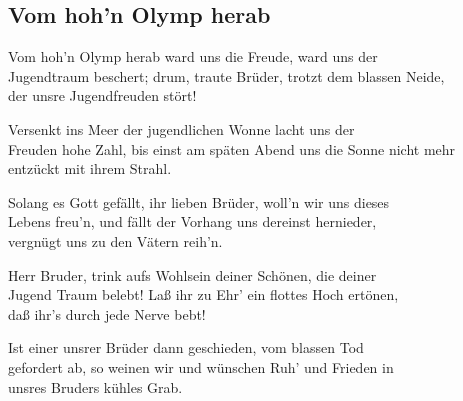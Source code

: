 
\subsection*{Vom hoh'n Olymp herab}
%


\thestrophe Vom hoh'n Olymp herab ward uns die Freude, ward uns der \\
Jugendtraum beschert; drum, traute Brüder, trotzt dem blassen Neide, \\
der unsre Jugendfreuden stört! 

\thestrophe Versenkt ins Meer der jugendlichen Wonne lacht uns der \\
Freuden hohe Zahl, bis einst am späten Abend uns die Sonne nicht mehr \\
entzückt mit ihrem Strahl. 

\thestrophe Solang es Gott gefällt, ihr lieben Brüder, woll'n wir uns dieses \\
Lebens freu'n, und fällt der Vorhang uns dereinst hernieder, \\
vergnügt uns zu den Vätern reih'n. 

\thestrophe Herr Bruder, trink aufs Wohlsein deiner Schönen, die deiner \\
Jugend Traum belebt! Laß ihr zu Ehr' ein flottes Hoch ertönen, \\
daß ihr's durch jede Nerve bebt! 

\thestrophe Ist einer unsrer Brüder dann geschieden, vom blassen Tod \\
gefordert ab, so weinen wir und wünschen Ruh' und Frieden in \\
unsres Bruders kühles Grab.